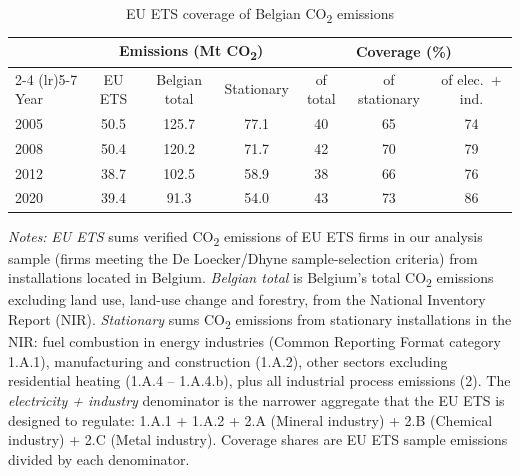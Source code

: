 \begin{table}[h]
    \centering
    \caption{EU ETS coverage of Belgian CO\textsubscript{2} emissions}
    \label{tab:ets_coverage_belgium}
    \small
    \begin{tabular}{l c c c c c c}
        \toprule
         & \multicolumn{3}{c}{Emissions (Mt CO\textsubscript{2})} & \multicolumn{3}{c}{Coverage (\%)} \\
        \cmidrule(lr){2-4} \cmidrule(lr){5-7}
        Year & EU ETS & Belgian total & Stationary & of total & of stationary & of elec.\ + ind. \\
        \midrule
        2005 & 50.5 & 125.7 & 77.1 & 40 & 65 & 74 \\
        2008 & 50.4 & 120.2 & 71.7 & 42 & 70 & 79 \\
        2012 & 38.7 & 102.5 & 58.9 & 38 & 66 & 76 \\
        2020 & 39.4 & 91.3 & 54.0 & 43 & 73 & 86 \\
        \bottomrule
    \end{tabular}
    \begin{minipage}{\textwidth}
        {\footnotesize \vspace{0.25cm} \noindent \textit{Notes:} \emph{EU ETS} sums verified CO\textsubscript{2} emissions of EU ETS firms in our analysis sample (firms meeting the De Loecker/Dhyne sample-selection criteria) from installations located in Belgium. \emph{Belgian total} is Belgium's total CO\textsubscript{2} emissions excluding land use, land-use change and forestry, from the National Inventory Report (NIR). \emph{Stationary} sums CO\textsubscript{2} emissions from stationary installations in the NIR: fuel combustion in energy industries (Common Reporting Format category 1.A.1), manufacturing and construction (1.A.2), other sectors excluding residential heating (1.A.4 -- 1.A.4.b), plus all industrial process emissions (2). The \emph{electricity + industry} denominator is the narrower aggregate that the EU ETS is designed to regulate: 1.A.1 + 1.A.2 + 2.A (Mineral industry) + 2.B (Chemical industry) + 2.C (Metal industry). Coverage shares are EU ETS sample emissions divided by each denominator.}
    \end{minipage}
\end{table}
